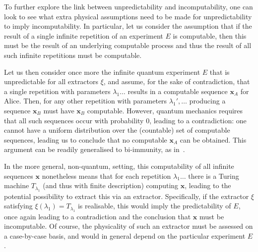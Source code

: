 \documentclass[%
 superscriptaddress,
 preprint,
 showpacs,
 showkeys,
 preprintnumbers,
 nofootinbib,
  amsmath,amssymb,
  aps,
 pra,
  longbibliography,
  floatfix,
 ]{revtex4-1}
\theoremstyle{definition}
\newcommand{\x}{\mathbf{x}}
\begin{document}


To further explore the link between unpredictability and incomputability, one can look to see what extra physical assumptions need to be made for unpredictability to imply incomputability.
In particular, let us consider the assumption that if the result of a single infinite repetition of an experiment $E$ is computable, then this must be the result of an underlying computable process and thus the result of all such infinite repetitions must be computable.

Let us then consider once more the infinite quantum experiment $E$ that is unpredictable for all extractors $\xi$, and assume, for the sake of contradiction, that a single repetition with parameters $\lambda_1\dots$ results in a computable sequence $\x_A$ for Alice.
Then, for any other repetition with parameters $\lambda_1',\dots$ producing a sequence $\x_B$ must have $\x_B$ computable.
However, quantum mechanics requires that all such sequences occur with probability 0, leading to a contradiction: one cannot have a uniform distribution over the (countable) set of computable sequences, leading us to conclude that no computable $\x_A$ can be obtained.
This argument can be readily generalised to bi-immunity, as in~\cite{2012-incomput-proofsCJ}.

In the more general, non-quantum, setting, this computability of all infinite sequences $\x$ nonetheless means that for each repetition $\lambda_1\dots$ there is a Turing machine $T_{\lambda_1}$ (and thus with finite description) computing $\x$, leading to the potential possibility to extract this via an extractor.
Specifically, if the extractor $\xi$ satisfying $\xi(\lambda_1)=T_{\lambda_1}$ is realisable, this would imply the predictability of $E$, once again leading to a contradiction and the conclusion that $\x$ must be incomputable.
Of course, the physicality of such an extractor must be assessed on a case-by-case basis, and would in general depend on the particular experiment $E$.
\end{document}
